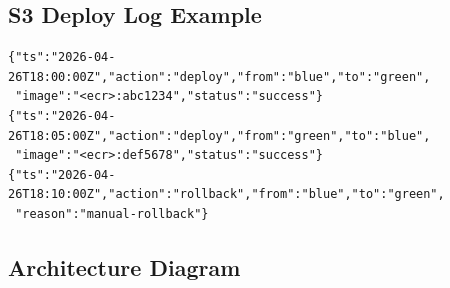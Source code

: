\documentclass[12pt,a4paper]{article}
\begin{document}
\subsection{S3 Deploy Log Example}

\begin{verbatim}
{"ts":"2026-04-26T18:00:00Z","action":"deploy","from":"blue","to":"green",
 "image":"<ecr>:abc1234","status":"success"}
{"ts":"2026-04-26T18:05:00Z","action":"deploy","from":"green","to":"blue",
 "image":"<ecr>:def5678","status":"success"}
{"ts":"2026-04-26T18:10:00Z","action":"rollback","from":"blue","to":"green",
 "reason":"manual-rollback"}
\end{verbatim}

\subsection{Architecture Diagram}
\end{document}
